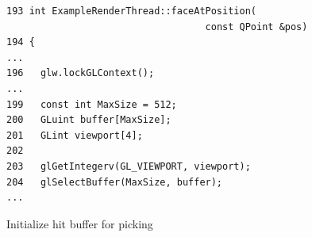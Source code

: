 \documentclass[jou,noapacite]{apa}
\begin{document}
\begin{figure}[h]
\begin{lstlisting}[basicstyle=\scriptsize]
193 int ExampleRenderThread::faceAtPosition(
                                   const QPoint &pos)
194 {
...
196   glw.lockGLContext();
...
199   const int MaxSize = 512;
200   GLuint buffer[MaxSize];
201   GLint viewport[4];
202
203   glGetIntegerv(GL_VIEWPORT, viewport);
204   glSelectBuffer(MaxSize, buffer);
...
\end{lstlisting}
\caption{Initialize hit buffer for picking}
\end{figure}
\end{document}
